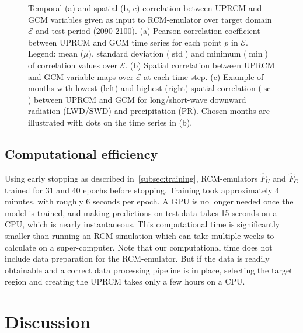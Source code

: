 \documentclass[a4paper,11pt,oneside]{report}
\begin{document}
\begin{figure}[!h]
\begin{subfigure}[b]{\columnwidth}
        \end{subfigure}
        \hfill
        \caption[]
        {\small Temporal (a) and spatial (b, c) correlation between UPRCM and GCM variables given as input to RCM-emulator over target domain $\mathcal{E}$ and test period (2090-2100). (a) Pearson correlation coefficient between UPRCM and GCM time series for each point $p$ in $\mathcal{E}$. Legend: mean ($\mu$), standard deviation ($\operatorname{std}$) and minimum ($\min$) of correlation values over $\mathcal{E}$. (b) Spatial correlation between UPRCM and GCM variable maps over $\mathcal{E}$ at each time step. (c) Example of months with lowest (left) and highest (right) spatial correlation ($\operatorname{sc}$) between UPRCM and GCM for long/short-wave downward radiation (LWD/SWD) and precipitation (PR). Chosen months are illustrated with dots on the time series in (b).} 
        \label{fig:corr-GCM-RCM}
    \end{figure}


\section{Computational efficiency}\label{sec:computational-efficiency}
Using early stopping as described in~\autoref{subsec:training}, RCM-emulators $\hat{F}_U$ and $\hat{F}_G$ trained for 31 and 40 epochs before stopping. Training took approximately 4 minutes, with roughly 6 seconds per epoch. A GPU is no longer needed once the model is trained, and making predictions on test data takes 15 seconds on a CPU, which is nearly instantaneous. This computational time is significantly smaller than running an RCM simulation which can take multiple weeks to calculate on a super-computer. Note that our computational time does not include data preparation for the RCM-emulator. But if the data is readily obtainable and a correct data processing pipeline is in place, selecting the target region and creating the UPRCM takes only a few hours on a CPU.



\chapter{Discussion}

\end{document}
